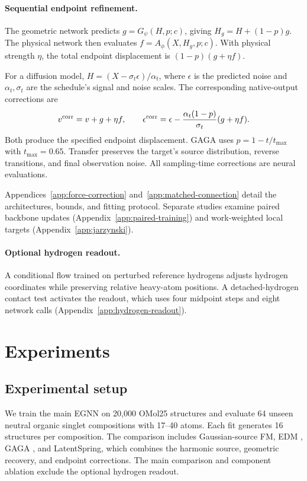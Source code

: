 \documentclass{article}
\begin{document}
\paragraph{Sequential endpoint refinement.}
The geometric network predicts $g=G_\psi(H,p;c)$, giving $H_g=H+(1-p)g$. The physical network then evaluates $f=A_\phi(X,H_g,p;c)$. With physical strength $\eta$, the total endpoint displacement is $(1-p)(g+\eta f)$.

For a diffusion model, $H=(X-\sigma_t\epsilon)/\alpha_t$, where $\epsilon$ is the predicted noise and $\alpha_t,\sigma_t$ are the schedule's signal and noise scales. The corresponding native-output corrections are
\begin{equation}
 v^{\rm corr}=v+g+\eta f,
 \qquad
 \epsilon^{\rm corr}=\epsilon-
       \frac{\alpha_t(1-p)}{\sigma_t}(g+\eta f).
 \label{eq:endpoint-native-updates}
\end{equation}
Both produce the specified endpoint displacement. GAGA uses $p=1-t/t_{\max}$ with $t_{\max}=0.65$. Transfer preserves the target's source distribution, reverse transitions, and final observation noise. All sampling-time corrections are neural evaluations.

Appendices~\ref{app:force-correction} and~\ref{app:matched-connection} detail the architectures, bounds, and fitting protocol. Separate studies examine paired backbone updates (Appendix~\ref{app:paired-training}) and work-weighted local targets (Appendix~\ref{app:jarzynski}).

\paragraph{Optional hydrogen readout.}
A conditional flow trained on perturbed reference hydrogens adjusts hydrogen coordinates while preserving relative heavy-atom positions. A detached-hydrogen contact test activates the readout, which uses four midpoint steps and eight network calls (Appendix~\ref{app:hydrogen-readout}).

\section{Experiments}\label{sec:experiments}
\subsection{Experimental setup}\label{sec:experimental-setup}
We train the main EGNN on 20,000 OMol25 structures and evaluate 64 unseen neutral organic singlet compositions with 17--40 atoms. Each fit generates 16 structures per composition. The comparison includes Gaussian-source FM, EDM \citep{edm}, GAGA \citep{qu2026gaga}, and LatentSpring, which combines the harmonic source, geometric recovery, and endpoint corrections. The main comparison and component ablation exclude the optional hydrogen readout.
\end{document}
